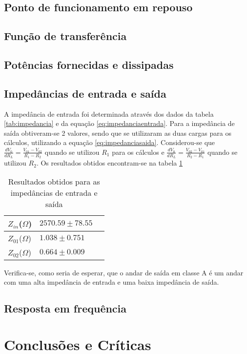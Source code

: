 \documentclass[%
  reprint,
  nofootinbib,
  amsmath,amssymb,
  aps,
  10pt,
  a4paper
]{revtex4-1}
\begin{document}
\subsection{Ponto de funcionamento em repouso}
\subsection{Função de transferência}
\subsection{Potências fornecidas e dissipadas}
\subsection{Impedâncias de entrada e saída}
A impedância de entrada foi determinada através dos dados da tabela \ref{tab:impedancia} e da equação \ref{eq:impedanciaentrada}. Para a impedância de saída obtiveram-se 2 valores, sendo que se utilizaram as duas cargas para os cálculos, utilizando a equação \ref{eq:impedanciasaida}. Considerou-se que $\frac{dV_0}{dR_L}=\frac{V_{01}-V_{02}}{R_1-R_2}$ quando se utilizou $R_1$ para os cálculos e $\frac{dV_0}{dR_L}=\frac{V_{02}-V_{01}}{R_2-R_1}$ quando se utilizou $R_2$. Os resultados obtidos encontram-se na tabela \ref{tab:analiseimpedancias}


\begin{table}[h]
    \begin{tabular}{|l|l|l|}
    \hline
    $Z_{in}$($\Omega$) & $2570.59 \pm 78.55$ \\ \hline
    $Z_{01}$($\Omega$) & $1.038\pm 0.751$  \\ \hline
    $Z_{02}$($\Omega$) & $0.664\pm0.009$  \\ \hline
    \end{tabular}
\caption{Resultados obtidos para as impedâncias de entrada e saída}
\label{tab:analiseimpedancias}
\end{table}

Verifica-se, como seria de esperar, que o andar de saída em classe A é um andar com uma alta impedância de entrada e uma baixa impedância de saída.


\subsection{Resposta em frequência}


\section{Conclusões e Críticas}
\label{s:conclu}
\end{document}
